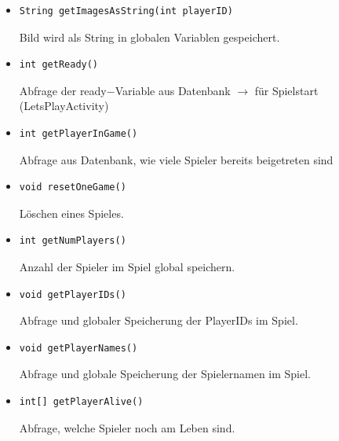 \documentclass[12pt, a4paper]{article}
\begin{document}
\begin{itemize}
\item \begin{verbatim}
String getImagesAsString(int playerID)
\end{verbatim}
\vspace{-0.2 cm}
Bild wird als String in globalen Variablen gespeichert.

\item \begin{verbatim}
int getReady()
\end{verbatim}
\vspace{-0.2 cm}
Abfrage der ready$-$Variable aus Datenbank $\rightarrow$ für Spielstart (LetsPlayActivity)

\item \begin{verbatim}
int getPlayerInGame()
\end{verbatim}
\vspace{-0.2 cm}
Abfrage aus Datenbank, wie viele Spieler bereits beigetreten sind 

\item \begin{verbatim}
void resetOneGame()
\end{verbatim}
\vspace{-0.2 cm}
Löschen eines Spieles.

\item \begin{verbatim}
int getNumPlayers()
\end{verbatim}
\vspace{-0.2 cm}
Anzahl der Spieler im Spiel global speichern.

\item \begin{verbatim}
void getPlayerIDs()
\end{verbatim}
\vspace{-0.2 cm}
Abfrage und globaler Speicherung der PlayerIDs im Spiel.

\item \begin{verbatim}
void getPlayerNames()
\end{verbatim}
\vspace{-0.2 cm}
Abfrage und globale Speicherung der Spielernamen im Spiel.

\item \begin{verbatim}
int[] getPlayerAlive()
\end{verbatim}
\vspace{-0.2 cm}
Abfrage, welche Spieler noch am Leben sind.


\end{itemize}
\end{document}
